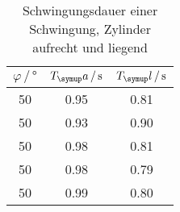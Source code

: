 \begin{table}
  \centering
  \begin{tabular}{c c c}
    \toprule
    $\varphi\,/\,\si{\degree}$ & $T_\su{a}\,/\,\si{\second}$ & $T_\su{l}\,/\,\si{\second}$ \\
    \midrule
    50 & 0.95 & 0.81 \\
    50 & 0.93 & 0.90 \\
    50 & 0.98 & 0.81 \\
    50 & 0.98 & 0.79 \\
    50 & 0.99 & 0.80 \\
    \bottomrule
  \end{tabular}
  \caption{Schwingungsdauer einer Schwingung, Zylinder aufrecht und liegend}
  \label{tab:ZeitZylinder}
\end{table}
